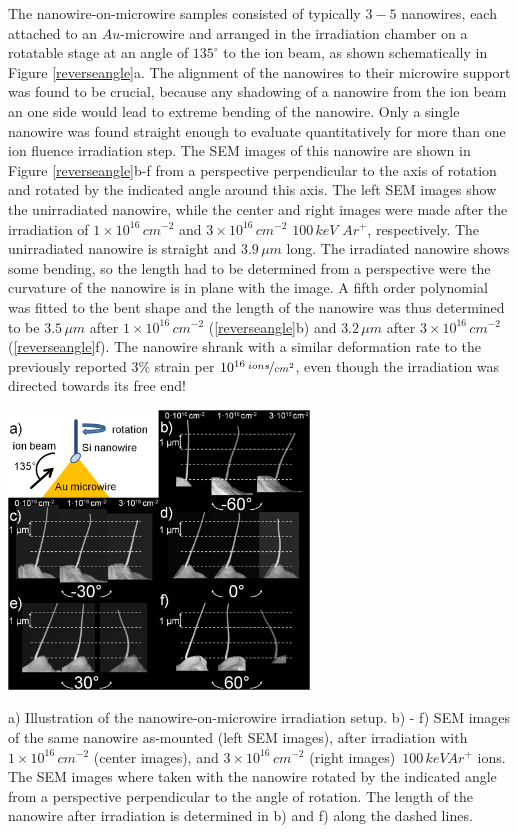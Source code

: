 \begin{Figure}[h]
The nanowire-on-microwire samples consisted of typically $3-5$ nanowires, each attached to an $Au$-microwire and arranged in the irradiation chamber on a rotatable stage at an angle of $135^\circ$ to the ion beam, as shown schematically in Figure \ref{reverseangle}a. The alignment of the nanowires to their microwire support was found to be crucial, because any shadowing of a nanowire from the ion beam an one side would lead to extreme bending of the nanowire. Only a single nanowire was found straight enough to evaluate quantitatively for more than one ion fluence irradiation step. The SEM images of this nanowire are shown in Figure \ref{reverseangle}b-f from a perspective perpendicular to the axis of rotation and rotated by the indicated angle around this axis. The left SEM images show the unirradiated nanowire, while the center and right images were made after the irradiation of $1\times10^{16}\,cm^{-2}$ and $3\times10^{16}\,cm^{-2}$ $100\,keV\,\,Ar^+$, respectively. The unirradiated nanowire is straight and $3.9\,\mu m$ long. The irradiated nanowire shows some bending, so the length had to be determined from a perspective were the curvature of the nanowire is in plane with the image. A fifth order polynomial was fitted to the bent shape and the length of the nanowire was thus determined to be $3.5\,\mu m$ after $1\times10^{16}\,cm^{-2}$ (\ref{reverseangle}b) and $3.2\,\mu m$ after $3\times10^{16}\,cm^{-2}$ (\ref{reverseangle}f). The nanowire shrank with a similar deformation rate to the previously reported $3\%$ strain per $10^{16}\,\nicefrac{ions}{cm^2}$, even though the irradiation was directed towards its free end!

\begin{Figure}[thbp]
	\centering
		\includegraphics[width=8cm]{images/reverseangle.jpg}
	\caption{ a) Illustration of the nanowire-on-microwire irradiation setup. b) - f) SEM images of the same nanowire as-mounted (left SEM images), after irradiation with $1\times10^{16}\,cm^{-2}$  (center images), and $3\times10^{16}\,cm^{-2}$ (right images) $\,100\,keV Ar^+$ ions. The SEM images where taken with the nanowire rotated by the indicated angle from a perspective perpendicular to the angle of rotation. The length of the nanowire after irradiation is determined in b) and f) along the dashed lines.}
	\label{reverseangle}
\end{Figure}


\end{Figure}
